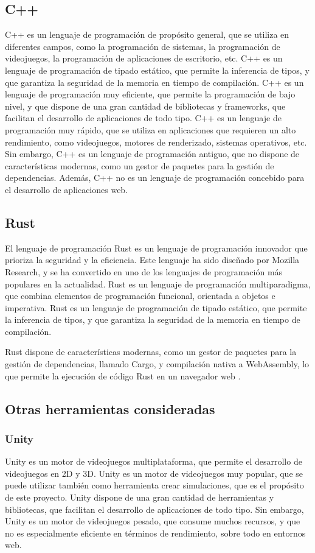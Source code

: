 \subsection{C++}
\noindent C++ es un lenguaje de programación de propósito general, que se utiliza en diferentes campos, como la programación de sistemas, la programación de videojuegos, la programación de aplicaciones de escritorio, etc. C++ es un lenguaje de programación de tipado estático, que permite la inferencia de tipos, y que garantiza la seguridad de la memoria en tiempo de compilación. C++ es un lenguaje de programación muy eficiente, que permite la programación de bajo nivel, y que dispone de una gran cantidad de bibliotecas y frameworks, que facilitan el desarrollo de aplicaciones de todo tipo. C++ es un lenguaje de programación muy rápido, que se utiliza en aplicaciones que requieren un alto rendimiento, como videojuegos, motores de renderizado, sistemas operativos, etc. Sin embargo, C++ es un lenguaje de programación antiguo, que no dispone de características modernas, como un gestor de paquetes para la gestión de dependencias. Además, C++ no es un lenguaje de programación concebido para el desarrollo de aplicaciones web.

\subsection{Rust}
\noindent El lenguaje de programación Rust es un lenguaje de programación innovador que prioriza la seguridad y la eficiencia. Este lenguaje ha sido diseñado por Mozilla Research, y se ha convertido en uno de los lenguajes de programación más populares en la actualidad. Rust es un lenguaje de programación multiparadigma, que combina elementos de programación funcional, orientada a objetos e imperativa. Rust es un lenguaje de programación de tipado estático, que permite la inferencia de tipos, y que garantiza la seguridad de la memoria en tiempo de compilación. 

Rust dispone de características modernas, como un gestor de paquetes para la gestión de dependencias, llamado Cargo, y compilación nativa a WebAssembly, lo que permite la ejecución de código Rust en un navegador web \autocite{WebAssembly}.

\subsection{Otras herramientas consideradas}
\subsubsection{Unity}
\noindent Unity es un motor de videojuegos multiplataforma, que permite el desarrollo de videojuegos en 2D y 3D. Unity es un motor de videojuegos muy popular, que se puede utilizar también como herramienta crear simulaciones, que es el propósito de este proyecto. Unity dispone de una gran cantidad de herramientas y bibliotecas, que facilitan el desarrollo de aplicaciones de todo tipo. Sin embargo, Unity es un motor de videojuegos pesado, que consume muchos recursos, y que no es especialmente eficiente en términos de rendimiento, sobre todo en entornos web.

